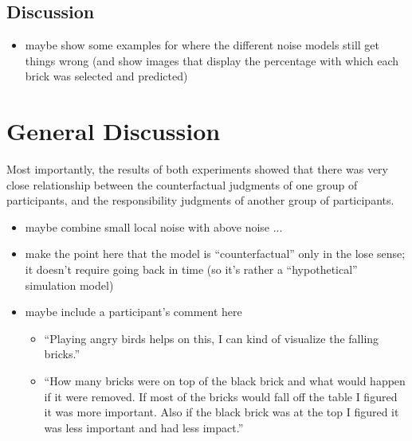 \documentclass[10pt, letterpaper]{article}
\begin{document}
\subsection{Discussion}
\label{sub:discussion}

\begin{itemize}
	\item maybe show some examples for where the different noise models still get things wrong (and show images that display the percentage with which each brick was selected and predicted)
\end{itemize}

\section{General Discussion}

Most importantly, the results of both experiments showed that there was very close relationship between the counterfactual judgments of one group of participants, and the responsibility judgments of another group of participants. 

\begin{itemize}
	\item maybe combine small local noise with above noise ... 
	\item make the point here that the model is ``counterfactual'' only in the lose sense; it doesn't require going back in time (so it's rather a ``hypothetical'' simulation model)
	\item maybe include a participant's comment here
	\begin{itemize}
	 	\item ``Playing angry birds helps on this, I can kind of visualize the falling bricks.''
	 	\item ``How many bricks were on top of the black brick and what would happen if it were removed. If most of the bricks would fall off the table I figured it was more important. Also if the black brick was at the top I figured it was less important and had less impact.''
	 \end{itemize} 
\end{itemize}

\fontsize{9}{11}


\def\thebibliography#1{\section*{References}
\fontsize{7}{8}\selectfont
 \list
 {[\arabic{enumi}]}{\leftmargin \parindent
	 \itemindent -\parindent
	 \itemsep 0ex plus 1pt
	 \parsep 0.2ex plus 1pt minus 1pt
	 \usecounter{enumi}}
	 \def\newbrick{\hskip .11em plus .33em minus .07em}
	 \sloppy\clubpenalty4000\widowpenalty4000
	 \sfcode`\.=1000\relax}
\end{document}
